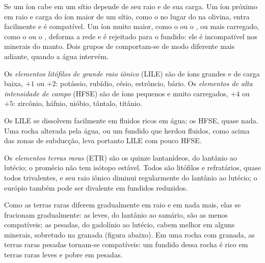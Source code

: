 Se um íon cabe em um sítio depende de seu raio e de sua carga. Um íon próximo em
raio e carga do íon maior de um sítio, como o  no lugar do  na
olivina, entra facilmente e é compatível. Um íon muito maior, como o
 ou o , ou mais carregado, como o  ou o
, deforma a rede e é rejeitado para o fundido: ele é
incompatível nos minerais do manto. Dois grupos de 
comportam-se de modo diferente mais adiante, quando a água intervém.

\begin{definition}
\label{def:b2:elements-in-the-earth:lile-hfse}
Os \emph{elementos litófilos de grande raio iônico}
(LILE) são  de íons grandes e de carga baixa, $+1$ ou $+2$:
potássio, rubídio, césio, estrôncio, bário. Os
\emph{elementos de alta intensidade de campo} (HFSE)
são  de íons pequenos e muito carregados, $+4$ ou $+5$:
zircônio, háfnio, nióbio, tântalo, titânio.
\end{definition}

Os LILE se dissolvem facilmente em fluidos ricos em água; os HFSE, quase nada. Uma rocha
alterada pela água, ou um fundido que herdou fluidos, como acima das zonas de subducção,
leva portanto LILE com pouco HFSE.

\begin{definition}\label{def:b2:elements-in-the-earth:ree}
Os \emph{elementos terras raras} (ETR) são os quinze
lantanídeos, do lantânio ao lutécio; o promécio não tem isótopo estável. Todos
são litófilos e refratários, quase todos trivalentes, e seu raio iônico
diminui regularmente do lantânio ao lutécio; o európio também pode ser divalente em
fundidos reduzidos.
\end{definition}

Como as terras raras diferem gradualmente em raio e em nada mais, elas
se fracionam gradualmente: as leves, do lantânio ao samário, são as menos
compatíveis; as pesadas, do gadolínio ao lutécio, cabem melhor em alguns
minerais, sobretudo na granada (figura abaixo). Em uma rocha com granada, as terras raras
pesadas tornam-se compatíveis: um fundido dessa rocha é rico em terras raras leves e
pobre em pesadas.

